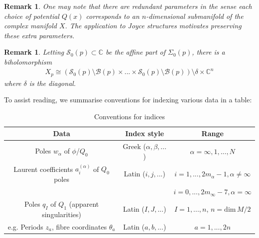 \documentclass[a4paper,12pt,reqno]{amsart}
\newcounter{counter2}
\numberwithin{equation}{section}
\numberwithin{counter2}{section}
\newcounter{counter3}
\newtheorem{rem}[counter2]{Remark}
\begin{document}
\begin{rem}
One may note that there are redundant parameters in the sense each choice of potential $Q(x)$ corresponds to an $n$-dimensional submanifold of the complex manifold $X$.  The application to Joyce structures motivates preserving these extra parameters.  
\end{rem}

\begin{rem}
Letting $\mathcal{S}_0(p) \subset \mathbb{C}$ be the affine part of $\Sigma_0(p)$,  there is a biholomorphism 
\begin{align}
X_p \cong (\mathcal{S}_0(p) \setminus \mathcal{B}(p) \times ...  \times \mathcal{S}_0(p) \setminus \mathcal{B}(p)) \setminus \delta \times \mathbb{C}^n
\end{align} 
where $\delta$ is the diagonal.  
\end{rem}
To assist reading,  we summarise conventions for indexing various data in a table:
\begin{table}[h]
\caption{Conventions for indices}
\centering
\begin{tabular}{|c|c|c|}
\hline
Data & Index style & Range  \\
\hline
Poles $w_\alpha$ of $\phi$/$Q_0$  & Greek ($\alpha,  \beta,...$) & $\alpha = \infty, 1,...,N$ \\
Laurent coefficients $a_i^{(\alpha)}$ of $Q_0$ poles & Latin ($i,j,...$) & $i = 1,...,2m_\alpha - 1,  \alpha \ne \infty  $  \\ 
& & $i = 0,...,2m_\infty - 7,  \alpha = \infty$ \\
Poles $q_I$ of $Q_1$ (apparent singularities) & Latin ($I,J,...$) & $I = 1,...,n$,  $n = \mathrm{dim} \,  M/2$ \\
e.g.  Periods $z_a$,  fibre coordinates $\theta_a$ & Latin ($a,b,...$) & $a = 1,...,2n$ \\
\hline
\end{tabular}
\end{table} 
\end{document}
